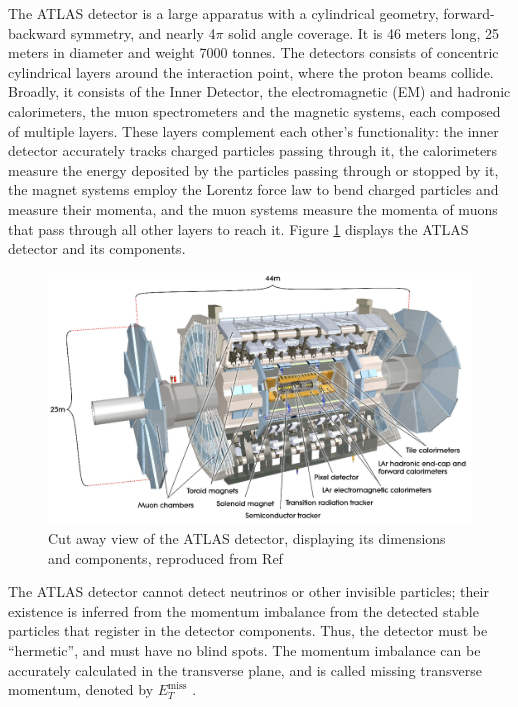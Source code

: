 \documentclass[12pt,a4paper,openright,twoside]{report}
\newcommand{\met}{$E_T^{\mathrm{miss}}$ }
\begin{document}
The ATLAS detector is a large apparatus with a cylindrical geometry, forward-backward symmetry, and nearly 4$\pi$ solid angle coverage. It is 46 meters long, 25 meters in diameter and weight 7000 tonnes. The detectors consists of concentric cylindrical layers around the interaction point, where the proton beams collide. Broadly, it consists of the  Inner Detector, the electromagnetic (EM) and hadronic calorimeters, the muon spectrometers and the magnetic systems, each composed of multiple layers. These layers complement each other's functionality: the inner detector accurately tracks charged particles passing through it, the calorimeters measure the energy deposited by the particles passing through or stopped by it, the magnet systems employ the Lorentz force law to bend charged particles and measure their momenta, and the muon systems measure the momenta of muons that pass through all other layers to reach it. Figure \ref{fig:ATLAS} displays the ATLAS detector and its components.

\begin{figure}[h]
\centering
\includegraphics[width=\textwidth]{ATLAS.png}
\caption{Cut away view of the ATLAS detector, displaying its dimensions and components, reproduced from Ref \cite{ATLAS_detector}}
\label{fig:ATLAS}
\end{figure}

The ATLAS detector cannot detect neutrinos or other invisible particles; their existence is inferred from the momentum imbalance from the detected stable particles that register in the detector components. Thus, the detector must be ``hermetic'', and must have no blind spots. The momentum imbalance can be accurately calculated in the transverse plane, and is called missing transverse momentum, denoted by \met.
\end{document}

